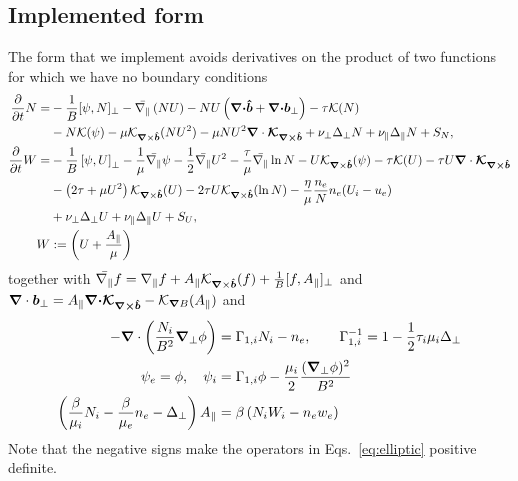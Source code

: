 \subsection{Implemented form}
The form that we implement avoids derivatives on the product of
two functions for which we have no boundary conditions
\begin{subequations}
    \begin{align}
    \frac{\partial}{\partial t} N =&
        - \frac{1}{B}[\psi, N]_{\perp}%
        - \bar \npar \left( NU\right)
        - NU\left(\vec \nc\bhat+\vec \nc{\vec b}_\perp\right)
        - \tau \mathcal K(N) \nonumber \\&
        - N \mathcal K(\psi)
        -\mu \mathcal K_{\vn\times\bhat}(NU^2)
        -\mu NU^2\nc \vec{ \mathcal K_{\vn\times\bhat}}
        + \nu_\perp\Delta_\perp N + \nu_\parallel \Delta_\parallel N + S_N, \\
    \frac{\partial}{\partial t} W =&
        - \frac{1}{B}\left[\psi, U\right]_{\perp}%
        - \frac{1}{\mu} \bar \npar \psi%
        - \frac{1}{2}\bar \npar U^2
        -\frac{\tau}{\mu} \bar \npar \ln N
        - U\mathcal K_{\vn\times\bhat}(\psi)
        - \tau \mathcal K(U)
        -\tau U\nc\vec{ \mathcal K_{\vn\times\bhat}}\nonumber\\&
        - \left(2\tau + {\mu}U^2\right) \mathcal K_{\vn\times\bhat} (U)
        -2\tau U\mathcal K_{\vn\times\bhat}(\ln N)
        - \frac{\eta}{\mu} \frac{n_e}{N}n_e(U_i - u_e) \nonumber\\&
        + \nu_\perp\Delta_\perp U
        + \nu_\parallel \Delta_\parallel U
        + S_U,
        \label{eq:EgyrofluidU} \\
        W&:= \left( U + \frac{A_\parallel}{\mu}\right)
    \end{align}
    \label{eq:Egyrofluid}
\end{subequations}
together with
$\bar{\nabla_\parallel} f = \nabla_\parallel f + A_\parallel \mathcal K_{{\boldsymbol{\nabla}}\times\bm{\hat{b}}}(f) + \frac{1}{B}[ f, A_\parallel]_\perp$
and ${\boldsymbol{\nabla}}\cdot { {\boldsymbol{b}}}_\perp = A_\parallel {\boldsymbol{{\boldsymbol{\nabla}}\cdot}}{\boldsymbol{ \mathcal{ K}_{{\boldsymbol{\nabla}}\times\bm{\hat{b}}}}} - \mathcal K_{{\boldsymbol{\nabla}} B}(A_\parallel) $
and
\begin{subequations} \label{eq:elliptic}
  \begin{align}
    -{\boldsymbol{\nabla}}\cdot\left( \frac{N_i}{B^2}{\boldsymbol{\nabla}}_{\perp} \phi \right) &= \Gamma_{1,i} N_i - n_e, \quad\quad
    \Gamma_{1,i}^{-1} = 1-\frac{1}{2}\tau_i\mu_i \Delta_\perp \\
    \psi_e = \phi, \quad \psi_i &= \Gamma_{1,i}\phi -\frac{\mu_i}{2}\frac{({\boldsymbol{\nabla}}_{\perp}\phi)^2}{B^2} \\
    \left(\frac{\beta}{\mu_i}N_i - \frac{\beta}{\mu_e}n_e-\Delta_\perp\right)
    A_\parallel &= \beta\left(N_iW_i-n_e w_e\right)
  \end{align}
\end{subequations}
Note that the negative signs make the operators in Eqs.~\eqref{eq:elliptic} positive definite.

